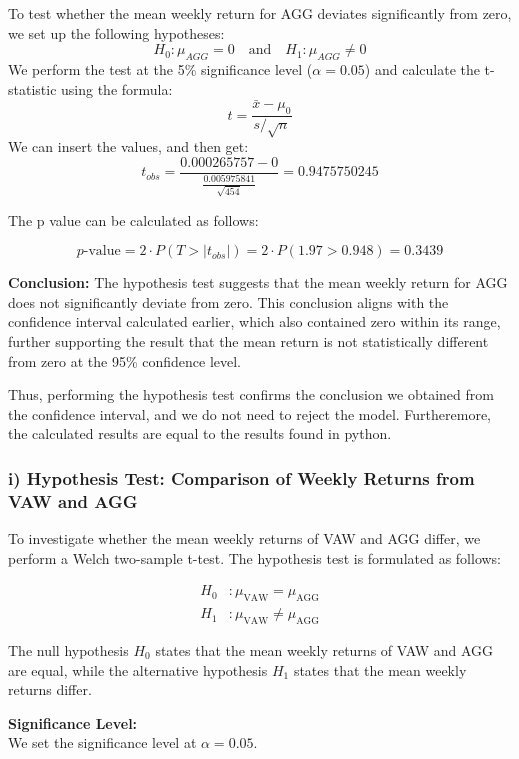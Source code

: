 \documentclass{rapport}
\begin{document}
To test whether the mean weekly return for AGG deviates significantly from zero, we set up the following hypotheses:
\[
H_0: \mu_{AGG} = 0 \quad \text{and} \quad H_1: \mu_{AGG} \neq 0
\]
We perform the test at the 5\% significance level (\( \alpha = 0.05 \)) and calculate the t-statistic using the formula:
\[
t = \frac{\bar{x} - \mu_0}{s / \sqrt{n}}
\]
\noindent
We can insert the values, and then get:
\[
t_{obs} = \frac{0.000265757 - 0}{\frac{0.005975841}{\sqrt{454}}} = 0.9475750245
\]

\noindent
The p value can be calculated as follows:

\[
p\text{-value} = 2 \cdot P(T > |t_{obs}|) = 2 \cdot P(1.97 > 0.948) = 0.3439
\]

\noindent
\textbf{Conclusion:} The hypothesis test suggests that the mean weekly return for AGG does not significantly deviate from zero. This conclusion aligns with the confidence interval calculated earlier, which also contained zero within its range, further supporting the result that the mean return is not statistically different from zero at the 95\% confidence level.

\noindent
Thus, performing the hypothesis test confirms the conclusion we obtained from the confidence interval, and we do not need to reject the model.
Furtheremore, the calculated results are equal to the results found in python. 


\subsubsection*{\textbf{i)} Hypothesis Test: Comparison of Weekly Returns from VAW and AGG}
\noindent
To investigate whether the mean weekly returns of VAW and AGG differ, we perform a Welch two-sample t-test. The hypothesis test is formulated as follows:


\begin{align*}
    H_0 &: \mu_{\text{VAW}} = \mu_{\text{AGG}} \\
    H_1 &: \mu_{\text{VAW}} \neq \mu_{\text{AGG}}
\end{align*}

\noindent
The null hypothesis $H_0$ states that the mean weekly returns of VAW and AGG are equal, while the alternative hypothesis $H_1$ states that the mean weekly returns differ.

\noindent
\textbf{Significance Level:} \\
We set the significance level at $\alpha = 0.05$.
\end{document}

